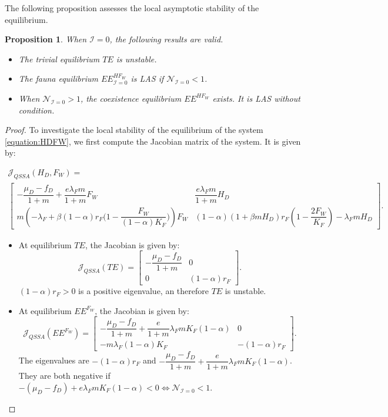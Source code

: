 \documentclass{article}
\newcommand{\lfw}{\lambda_{F}}
\newcommand{\lfw}{\lambda_{F}}
\newcommand{\cI}{\mathcal{I}}
\newtheorem{prop}[theorem]{Proposition}
\theoremstyle{definition}
\theoremstyle{remark}
\begin{document}
The following proposition assesses the local asymptotic stability of the equilibrium.

\begin{prop}\label{prop:stab 2D, cI=0}
When $\cI =0$, the following results are valid.
\begin{itemize}
\item The trivial equilibrium $TE$ is unstable.
\item The fauna equilibrium $EE^{HF_W}_{\cI = 0}$ is LAS if $\mathcal{N}_{\cI = 0} < 1$.
\item When $\mathcal{N}_{\cI = 0} > 1$, the coexistence equilibrium $EE^{HF_W}$ exists. It is LAS without condition.
\end{itemize}
\end{prop}

\begin{proof}
To investigate the local stability of the equilibrium of the system \eqref{equation:HDFW}, we first compute the Jacobian matrix of the system. It is given by:

\begin{multline}
\mathcal{J}_{QSSA}(H_D, F_W) = \\ \begin{bmatrix}
- \dfrac{\mu_D - f_D}{1+m} + \dfrac{e \lfw m}{1+m}  F_W & \dfrac{e \lfw m}{1+m}  H_D \\
m\left(-\lfw + \beta (1-\alpha) r_F \Big(1- \dfrac{F_W}{(1-\alpha)K_F} \Big) \right) F_W & (1-\alpha) (1+\beta m H_D) r_F \left(1 - \dfrac{2F_W}{K_F} \right) - \lfw m H_D
\end{bmatrix}.
\label{equation:Jqssa}
\end{multline}

\begin{itemize}
\item At equilibrium $TE$, the Jacobian is given by:
\begin{equation*}
\mathcal{J}_{QSSA}(TE) = \begin{bmatrix}
- \dfrac{\mu_D - f_D}{1+m} &0 \\
0 & (1-\alpha)  r_F 
\end{bmatrix}.
\end{equation*}
$(1-\alpha) r_F > 0$ is a positive eigenvalue, an therefore $TE$ is unstable.

\item At equilibrium $EE^{F_W}$, the Jacobian is given by: 
\begin{equation*}
\mathcal{J}_{QSSA}(EE^{F_W}) = \begin{bmatrix}
- \dfrac{\mu_D - f_D}{1+m} + \dfrac{e}{1+m}\lfw m K_F(1-\alpha) &0 \\
- m \lfw (1-\alpha)K_F & -(1-\alpha)  r_F 
\end{bmatrix}.
\end{equation*}
The eigenvalues are $-(1-\alpha)  r_F$ and $- \dfrac{\mu_D - f_D}{1+m} + \dfrac{e}{1+m}\lfw m K_F(1-\alpha)$. They are both negative if $-(\mu_D - f_D) + e\lfw m K_F(1-\alpha) <0 \Leftrightarrow \mathcal{N}_{\cI = 0} < 1$.


\end{itemize}
\end{proof}
\end{document}
